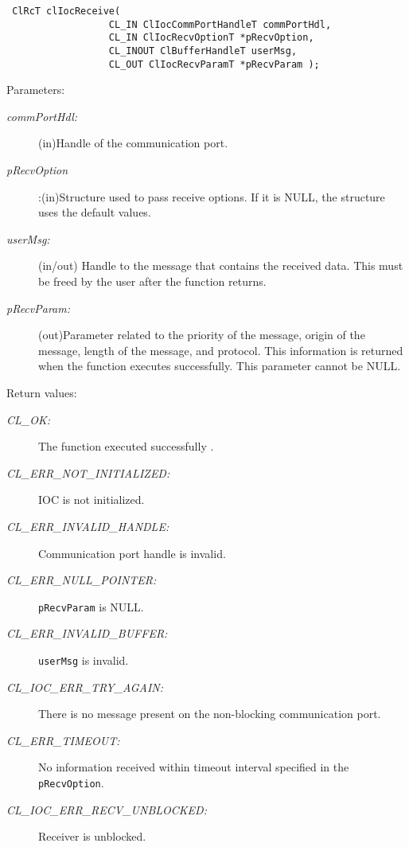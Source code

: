 \begin{flushleft}
\begin{Desc}
\footnotesize\begin{verbatim} ClRcT clIocReceive(
                  CL_IN ClIocCommPortHandleT commPortHdl,
                  CL_IN ClIocRecvOptionT *pRecvOption,
                  CL_INOUT ClBufferHandleT userMsg,
                  CL_OUT ClIocRecvParamT *pRecvParam );
\end{verbatim}
\normalsize
\end{Desc}
\begin{Desc}
\item[Parameters:]
\begin{description}
\item[{\em comm\-Port\-Hdl:}](in)Handle of the communication port. 
\item[{\em p\-Recv\-Option}]:(in)Structure used to pass receive options. If it is NULL, the structure uses the default values. 
\item[{\em user\-Msg:}](in/out) Handle to the message that contains the received data. This must be freed by the user after the function returns.
\item[{\em p\-Recv\-Param:}](out)Parameter related to the priority of the message, origin of the message, length of the message, and protocol. 
This information is returned when the function executes successfully. This parameter cannot be NULL.
\end{description}
\end{Desc}
\begin{Desc}
\item[Return values:]
\begin{description}
\item[{\em CL\_\-OK:}]The function executed successfully . 
\item[{\em CL\_\-ERR\_\-NOT\_\-INITIALIZED:}]IOC is not initialized. 
\item[{\em CL\_\-ERR\_\-INVALID\_\-HANDLE:}] Communication port handle is invalid. 
\item[{\em CL\_\-ERR\_\-NULL\_\-POINTER:}]{\tt{p\-Recv\-Param}} is NULL. 
\item[{\em CL\_\-ERR\_\-INVALID\_\-BUFFER:}]{\tt{user\-Msg}} is invalid. 
\item[{\em CL\_\-IOC\_\-ERR\_\-TRY\_\-AGAIN:}]There is no message present on the non-blocking communication port. 
\item[{\em CL\_\-ERR\_\-TIMEOUT:}]No information received within timeout interval specified in the {\tt{p\-Recv\-Option}}. 
\item[{\em CL\_\-IOC\_\-ERR\_\-RECV\_\-UNBLOCKED:}]Receiver is unblocked. 

\end{description}
\end{Desc}
\end{flushleft}
